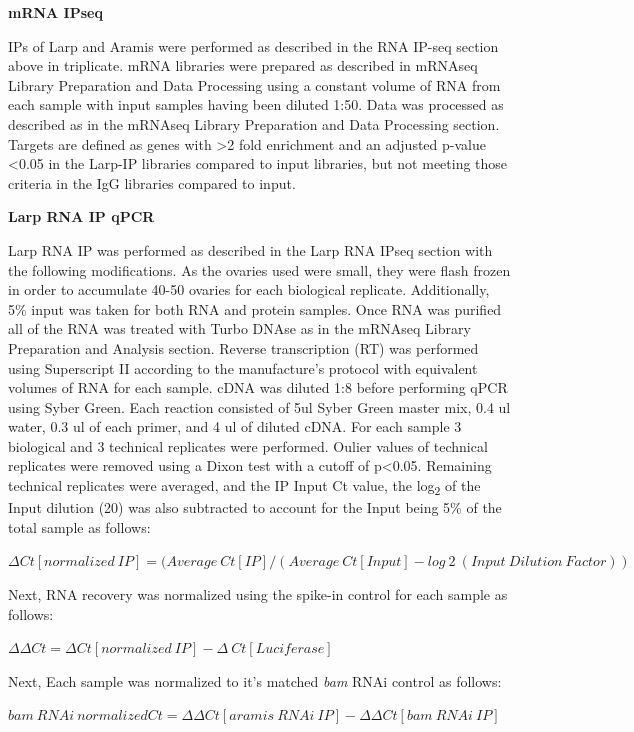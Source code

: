 \documentclass[12pt,oneside]{reedthesis}
\begin{document}
\textbf{mRNA IPseq}

IPs of Larp and Aramis were performed as described in the RNA IP-seq
section above in triplicate. mRNA libraries were prepared as described
in mRNAseq Library Preparation and Data Processing using a constant
volume of RNA from each sample with input samples having been diluted
1:50. Data was processed as described as in the mRNAseq Library
Preparation and Data Processing section. Targets are defined as genes
with \textgreater2 fold enrichment and an adjusted p-value \textless0.05 in the Larp-IP
libraries compared to input libraries, but not meeting those criteria in
the IgG libraries compared to input.

\textbf{Larp RNA IP qPCR}

Larp RNA IP was performed as described in the Larp RNA IPseq section
with the following modifications. As the ovaries used were small, they
were flash frozen in order to accumulate 40-50 ovaries for each
biological replicate. Additionally, 5\% input was taken for both RNA and
protein samples. Once RNA was purified all of the RNA was treated with
Turbo DNAse as in the {} mRNAseq Library Preparation and
Analysis section. Reverse transcription (RT) was performed using
Superscript II according to the manufacture's protocol with equivalent
volumes of RNA for each sample. cDNA was diluted 1:8 before performing
qPCR using Syber Green. Each reaction consisted of 5ul Syber Green
master mix, 0.4 ul water, 0.3 ul of each primer, and 4 ul of diluted
cDNA. For each sample 3 biological and 3 technical replicates were
performed. Oulier values of technical replicates were removed using a
Dixon test with a cutoff of p\textless0.05. Remaining technical replicates were
averaged, and the IP Input Ct value, the log\textsubscript{2} of the Input dilution
(20) was also subtracted to account for the Input being 5\% of the total
sample as follows:

\(\Delta Ct[normalized\ IP] = (Average\ Ct[IP]/(Average\ Ct[Input] - log~2~(Input\ Dilution\ Factor))\)

Next, RNA recovery was normalized using the spike-in control for each
sample as follows:

\(\Delta \Delta Ct = \Delta Ct[normalized\ IP]-\Delta\ Ct[Luciferase]\)

Next, Each sample was normalized to it's matched \emph{bam} RNAi control as
follows:

\(bam\ RNAi\ normalized Ct= \Delta \Delta Ct[aramis\ RNAi\ IP] - \Delta \Delta Ct[bam\ RNAi\ IP]\)
\end{document}
